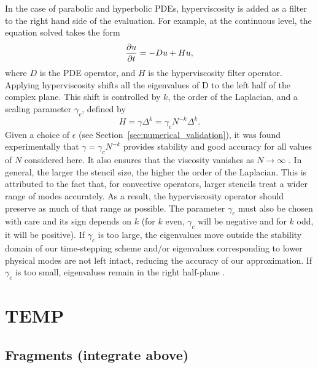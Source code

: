 \documentclass{report}
\begin{document}
{In the case of parabolic and hyperbolic PDEs, hyperviscosity is added as a filter to the right hand side of the evaluation. For example, at the continuous level, 
the equation solved takes the form
\begin{equation}
\frac{\partial u}{\partial t} = - D u + H u,
\label{eq:evaluation_with_hyperviscosity}
\end{equation}
where $D$ is the PDE operator, and $H$ is the hyperviscosity filter operator.
Applying hyperviscosity shifts all the eigenvalues of D to the left half of the complex plane. 
This shift is controlled by $k$, the order of the Laplacian, and a scaling parameter $\gamma_c$, defined by
\begin{equation*}	
H = \gamma \Delta^{k} = \gamma_c N^{-k} \Delta^{k}.
\end{equation*}
Given a choice of $\epsilon$ (see Section~\ref{sec:numerical_validation}), it was found experimentally that $\gamma = \gamma_c N^{-k}$  provides stability and good accuracy for all values of $N$ considered here. It also ensures that the viscosity vanishes as $N\rightarrow\infty$ \cite{FlyerLehto11}.
In general, the larger the stencil size, the higher the order of the Laplacian.  This is attributed to the fact that, for convective operators, larger stencils treat a wider range of modes accurately. As a result, the hyperviscosity operator should preserve as much of that range as possible. The parameter $\gamma_c$ must also be chosen with care and its sign depends on $k$ (for $k$ even, $\gamma_c$ will be negative and for $k$ odd, it will be positive). If $\gamma_c$ is too large, the eigenvalues move outside the stability domain of our time-stepping scheme and/or eigenvalues corresponding to lower physical modes are not left intact, reducing the accuracy of our approximation. If $\gamma_c$ is too small, eigenvalues remain in the right half-plane \cite{FornbergLehto11,FlyerLehto11}.



\chapter{TEMP}


\section{Fragments (integrate above)}

}
\end{document}
